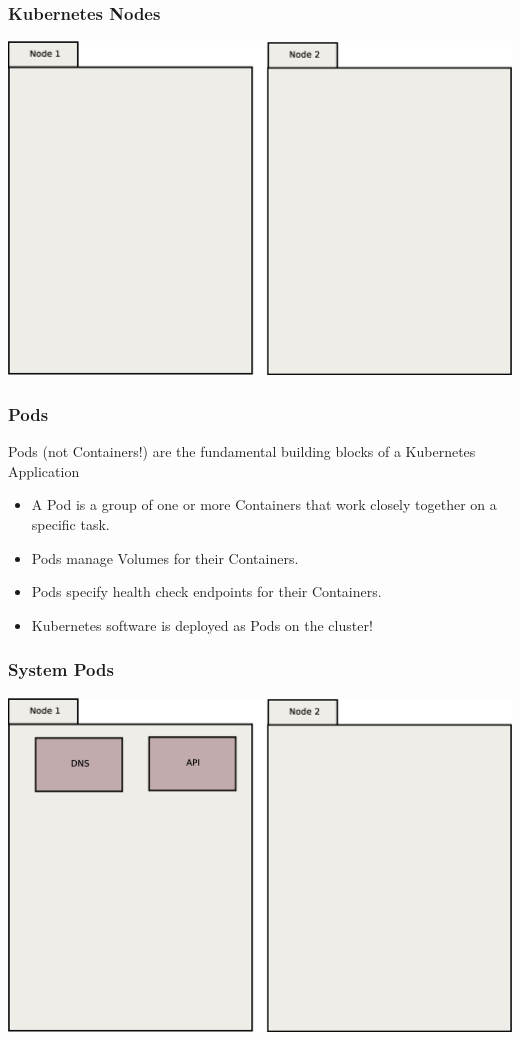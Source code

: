 \documentclass{beamer}
\begin{document}
\begin{frame}
    \frametitle{Kubernetes Nodes}
    \includegraphics[width=\textwidth,height=0.85\textheight,keepaspectratio]{graphics/00-nodes.eps}
\end{frame}

\begin{frame}
    \frametitle{Pods}
    Pods (not Containers!) are the fundamental building blocks of a Kubernetes Application\pause
    \begin{itemize}
        \item A Pod is a group of one or more Containers that work closely together on a specific task.\pause
        \item Pods manage Volumes for their Containers.\pause
        \item Pods specify health check endpoints for their Containers.\pause
        \item Kubernetes software is deployed as Pods on the cluster!
    \end{itemize}
\end{frame}

\begin{frame}
    \frametitle{System Pods}
    \includegraphics[width=\textwidth,height=0.85\textheight,keepaspectratio]{graphics/01-systemPods.eps}
\end{frame}
\end{document}
